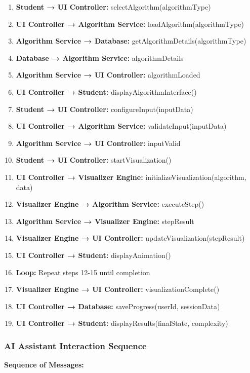 \begin{enumerate}
    \item \textbf{Student → UI Controller:} selectAlgorithm(algorithmType)
    \item \textbf{UI Controller → Algorithm Service:} loadAlgorithm(algorithmType)
    \item \textbf{Algorithm Service → Database:} getAlgorithmDetails(algorithmType)
    \item \textbf{Database → Algorithm Service:} algorithmDetails
    \item \textbf{Algorithm Service → UI Controller:} algorithmLoaded
    \item \textbf{UI Controller → Student:} displayAlgorithmInterface()
    \item \textbf{Student → UI Controller:} configureInput(inputData)
    \item \textbf{UI Controller → Algorithm Service:} validateInput(inputData)
    \item \textbf{Algorithm Service → UI Controller:} inputValid
    \item \textbf{Student → UI Controller:} startVisualization()
    \item \textbf{UI Controller → Visualizer Engine:} initializeVisualization(algorithm, data)
    \item \textbf{Visualizer Engine → Algorithm Service:} executeStep()
    \item \textbf{Algorithm Service → Visualizer Engine:} stepResult
    \item \textbf{Visualizer Engine → UI Controller:} updateVisualization(stepResult)
    \item \textbf{UI Controller → Student:} displayAnimation()
    \item \textbf{Loop:} Repeat steps 12-15 until completion
    \item \textbf{Visualizer Engine → UI Controller:} visualizationComplete()
    \item \textbf{UI Controller → Database:} saveProgress(userId, sessionData)
    \item \textbf{UI Controller → Student:} displayResults(finalState, complexity)
\end{enumerate}

\subsubsection{AI Assistant Interaction Sequence}

\textbf{Sequence of Messages:}

